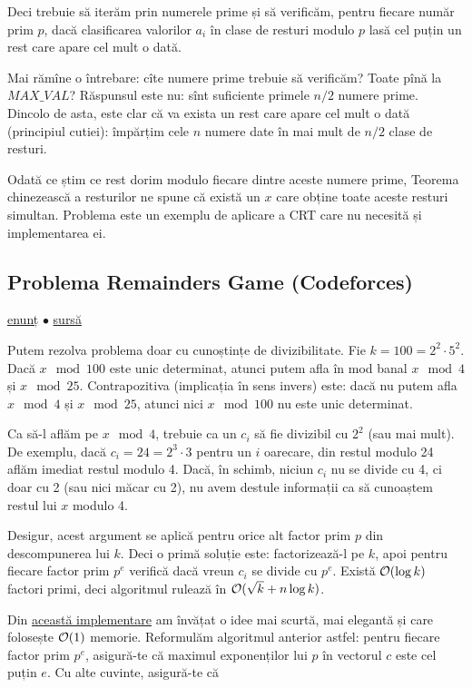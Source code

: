\documentclass[../main.tex]{subfiles}
\begin{document}
Deci trebuie să iterăm prin numerele prime și să verificăm, pentru fiecare număr prim $p$, dacă clasificarea valorilor $a_i$ în clase de resturi modulo $p$ lasă cel puțin un rest care apare cel mult o dată.

Mai rămîne o întrebare: cîte numere prime trebuie să verificăm? Toate pînă la $MAX\_VAL$? Răspunsul este nu: sînt suficiente primele $n/2$ numere prime. Dincolo de asta, este clar că va exista un rest care apare cel mult o dată (principiul cutiei): împărțim cele $n$ numere date în mai mult de $n/2$ clase de resturi.

Odată ce știm ce rest dorim modulo fiecare dintre aceste numere prime, Teorema chinezească a resturilor ne spune că există un $x$ care obține toate aceste resturi simultan. Problema este un exemplu de aplicare a CRT care nu necesită și implementarea ei.


\subsection{Problema Remainders Game (Codeforces)}
\label{problem:remainders-game}

\href{https://codeforces.com/contest/687/problem/B}{enunț}
$\bullet$
\hyperref[code:remainders-game]{sursă}

Putem rezolva problema doar cu cunoștințe de divizibilitate. Fie $k = 100 = 2^2 \cdot 5^2$. Dacă $x \mod 100$ este unic determinat, atunci putem afla în mod banal $x \mod 4$ și $x \mod 25$. Contrapozitiva (implicația în sens invers) este: dacă nu putem afla $x \mod 4$ și $x \mod 25$, atunci nici $x \mod 100$ nu este unic determinat.

Ca să-l aflăm pe $x \mod 4$, trebuie ca un $c_i$ să fie divizibil cu $2^2$ (sau mai mult). De exemplu, dacă $c_i = 24 = 2^3 \cdot 3$ pentru un $i$ oarecare, din restul modulo 24 aflăm imediat restul modulo 4. Dacă, în schimb, niciun $c_i$ nu se divide cu 4, ci doar cu 2 (sau nici măcar cu 2), nu avem destule informații ca să cunoaștem restul lui $x$ modulo 4.

Desigur, acest argument se aplică pentru orice alt factor prim $p$ din descompunerea lui $k$. Deci o primă soluție este: factorizează-l pe $k$, apoi pentru fiecare factor prim $p^e$ verifică dacă vreun $c_i$ se divide cu $p^e$. Există $\mathcal{O}(\log k)$ factori primi, deci algoritmul rulează în $\mathcal{O}(\sqrt{k} + n \log k)$.

Din \href{https://codeforces.com/contest/687/submission/18789803}{această implementare} am învățat o idee mai scurtă, mai elegantă și care folosește $\mathcal{O}(1)$ memorie. Reformulăm algoritmul anterior astfel: pentru fiecare factor prim $p^e$, asigură-te că maximul exponenților lui $p$ în vectorul $c$ este cel puțin $e$. Cu alte cuvinte, asigură-te că
\end{document}
